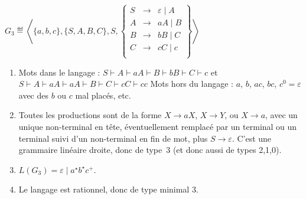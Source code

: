 \begin{exercice}
  \begin{questions}
  \item $G_3 \eqdef \left\langle \{a, b, c\}, \{S, A, B, C\}, S,
    \left\{\begin{array}{rcl}
    S   &\rightarrow& \varepsilon \mid  A \\
    A   &\rightarrow& aA \mid  B \\
    B   &\rightarrow& bB \mid  C \\
    C   &\rightarrow& cC \mid  c\\
    \end{array}\right\}  \right\rangle$
  \end{questions}
  \begin{corrections}
    \begin{enumerate}
    \item Mots dans le langage :
      $S \vdash A \vdash aA \vdash B \vdash bB \vdash C \vdash c$ et
      $S \vdash A \vdash aA \vdash aA \vdash B \vdash C \vdash cC \vdash cc$
      Mots hors du langage : $a$, $b$, $ac$, $bc$, $c^0=\varepsilon$ avec des $b$ ou $c$ mal placés, etc.
    \item Toutes les productions sont de la forme $X \to aX$, $X \to Y$, ou $X \to a$,
      avec un unique non-terminal en tête, éventuellement remplacé par un terminal
      ou un terminal suivi d'un non-terminal en fin de mot, plus $S \to \varepsilon$.  
      C'est une grammaire linéaire droite, donc de type~3 (et donc aussi de types 2,1,0).
    \item $L(G_3) = \varepsilon \mid a^\star b^\star c^+$.
    \item Le langage est rationnel, donc de type minimal 3.  
    \end{enumerate}
  \end{corrections}


\end{exercice}
